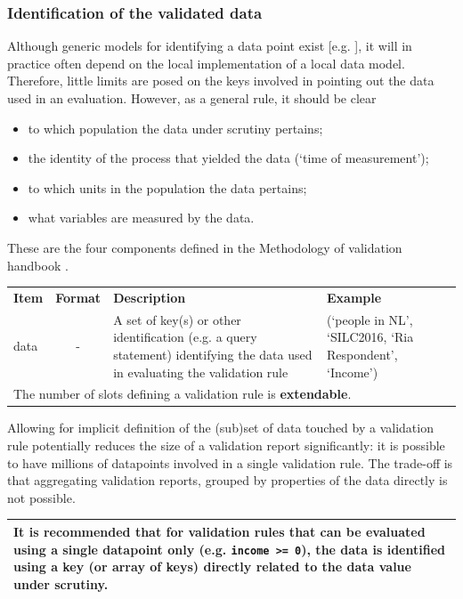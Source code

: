 \documentclass[a4paper, 11pt,titlepage]{article}
\newcommand{\code}[1]{\texttt{#1}}
\begin{document}
\subsubsection{Identification of the validated data}
Although generic models for identifying a data point exist [e.g.
\citet[Chapter~5]{zio2015methodology}], it will in practice often depend on the
local implementation of a local data model. Therefore, little limits are posed
on the keys involved in pointing out the data used in an evaluation. However,
as a general rule, it should be clear 
\begin{itemize}[itemsep=0pt]
\item to which population the data under scrutiny pertains;
\item the identity of the process that yielded the data (`time of measurement');
\item to which units in the population the data pertains;
\item what variables are measured by the data.
\end{itemize}
These are the four components defined in the Methodology of validation handbook 
\citep{zio2015methodology}.


\begin{center}
\begin{tabular}{|lp{15mm}p{}p{}|}
\hline
\textbf{Item} & \textbf{Format} & \textbf{Description} &\textbf{Example}\\
data    &\multicolumn{1}{c}{-} & A set of key(s) or other identification (e.g.
a query statement) identifying the data used in evaluating the validation rule
&  (`people in NL', `SILC2016, `Ria Respondent', `Income')\\
\hline
\multicolumn{4}{|l|}{The number of slots defining a validation rule is \textbf{extendable}.
}\\
\hline
\end{tabular}
\end{center}


Allowing for implicit definition of the (sub)set of data touched by a
validation rule potentially reduces the size of a validation report
significantly: it is possible to have millions of datapoints involved in a
single validation rule. The trade-off is that aggregating validation reports,
grouped by properties of the data directly is not possible.

\begin{tabular}{|p{}|}
\hline
It is recommended that for validation rules that can be evaluated using a
single datapoint only (e.g. \code{income >= 0}), the data is identified using a
key (or array of keys) directly related to the data value under scrutiny.\\
\hline
\end{tabular}
\end{document}
